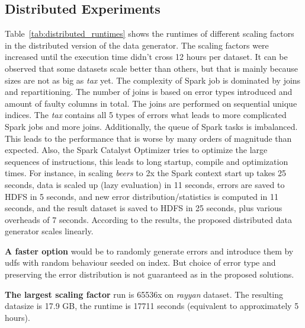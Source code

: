\subsection{Distributed Experiments}
\label{sec:runtime_distributed}

Table~\ref{tab:distributed_runtimes} shows the runtimes of different scaling factors in the distributed version of the data generator.
The scaling factors were increased until the execution time didn't cross 12 hours per dataset.
It can be observed that some datasets scale better than others, but that is mainly because sizes are not as big as \textit{tax} yet. 
The complexity of Spark job is dominated by joins and repartitioning.
The number of joins is based on error types introduced and amount of faulty columns in total.
The joins are performed on sequential unique indices.
The \textit{tax} contains all 5 types of errors what leads to more complicated Spark jobs and more joins.
Additionally, the queue of Spark tasks is imbalanced. 
This leads to the performance that is worse by many orders of magnitude than expected.
Also, the Spark Catalyst Optimizer tries to optimize the large sequences of instructions, this leads to long startup, compile and optimization times. 
For instance, in scaling \textit{beers} to 2x the Spark context start up takes 25 seconds, data is scaled up (lazy evaluation) in 11 seconds, errors are saved to HDFS in 5 seconds, and new error distribution/statistics is computed in 11 seconds, and the result dataset is saved to HDFS in 25 seconds, plus various overheads of 7 seconds.
According to the results, the proposed distributed data generator scales linearly.

\textbf{A faster option} would be to randomly generate errors and introduce them by udfs with random behaviour seeded on index.
But choice of error type and preserving the error distribution is not guaranteed as in the proposed solutions.

\textbf{The largest scaling factor} run is 65536x on \textit{rayyan} dataset. 
The resulting datasize is 17.9 GB, the runtime is 17711 seconds (equivalent to approximately 5 hours).

